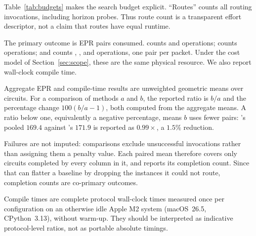 Table~\ref{tab:budgets} makes the search budget explicit. ``Routes'' counts
all routing invocations, including horizon probes. Thus route count is a
transparent effort descriptor, not a claim that routes have equal runtime.


The primary outcome is EPR pairs consumed. \TeleSABRE{} counts \TeleData{}
and \TeleGate{} operations; \dSABRE{} counts \TeleData{} operations; and
\PORTER{} counts \TeleData{}, \TeleGate{}, and \TeleGatePacket{} operations,
one pair per packet. Under the cost model of Section~\ref{sec:scope}, these are the
same physical resource. We also report wall-clock compile time.

Aggregate EPR and compile-time results are unweighted geometric means
over circuits. For a
comparison of methods $a$ and $b$, the reported ratio is $b/a$ and the
percentage change $100(b/a-1)$, both computed from the aggregate means. A
ratio below one, equivalently a negative percentage, means $b$ uses fewer
pairs: \PORTER{}'s pooled $169.4$ against \dSABRE{}'s $171.9$ is reported as
$0.99\times$, a $1.5\%$ reduction.

Failures are not imputed: comparisons exclude unsuccessful invocations
rather than assigning them a penalty value. Each paired mean therefore
covers only circuits completed by every column in it, and reports its
completion count. Since that can flatter a baseline by dropping the
instances it could not route, completion counts are co-primary outcomes.

Compile times are complete protocol wall-clock times measured once per
configuration on an otherwise idle Apple M2 system (macOS~26.5,
CPython~3.13), without warm-up. They should be interpreted as indicative
protocol-level ratios, not as portable absolute timings.
